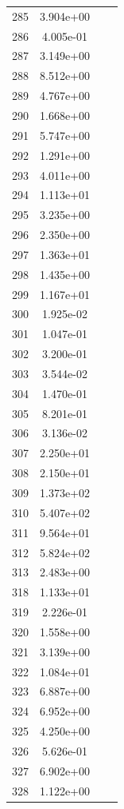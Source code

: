 \documentclass[12pt]{article}
\begin{document}
\begin{longtable}{@{}cccc@{}}
285 & 3.904e+00 &  &  \\
286 & 4.005e-01 &  &  \\
287 & 3.149e+00 &  &  \\
288 & 8.512e+00 &  &  \\
289 & 4.767e+00 &  &  \\
290 & 1.668e+00 &  &  \\
291 & 5.747e+00 &  &  \\
292 & 1.291e+00 &  &  \\
293 & 4.011e+00 &  &  \\
294 & 1.113e+01 &  &  \\
295 & 3.235e+00 &  &  \\
296 & 2.350e+00 &  &  \\
297 & 1.363e+01 &  &  \\
298 & 1.435e+00 &  &  \\
299 & 1.167e+01 &  &  \\
300 & 1.925e-02 &  &  \\
301 & 1.047e-01 &  &  \\
302 & 3.200e-01 &  &  \\
303 & 3.544e-02 &  &  \\
304 & 1.470e-01 &  &  \\
305 & 8.201e-01 &  &  \\
306 & 3.136e-02 &  &  \\
307 & 2.250e+01 &  &  \\
308 & 2.150e+01 &  &  \\
309 & 1.373e+02 &  &  \\
310 & 5.407e+02 &  &  \\
311 & 9.564e+01 &  &  \\
312 & 5.824e+02 &  &  \\
313 & 2.483e+00 &  &  \\
318 & 1.133e+01 &  &  \\
319 & 2.226e-01 &  &  \\
320 & 1.558e+00 &  &  \\
321 & 3.139e+00 &  &  \\
322 & 1.084e+01 &  &  \\
323 & 6.887e+00 &  &  \\
324 & 6.952e+00 &  &  \\
325 & 4.250e+00 &  &  \\
326 & 5.626e-01 &  &  \\
327 & 6.902e+00 &  &  \\
328 & 1.122e+00 &  &  \\

\end{longtable}
\end{document}
